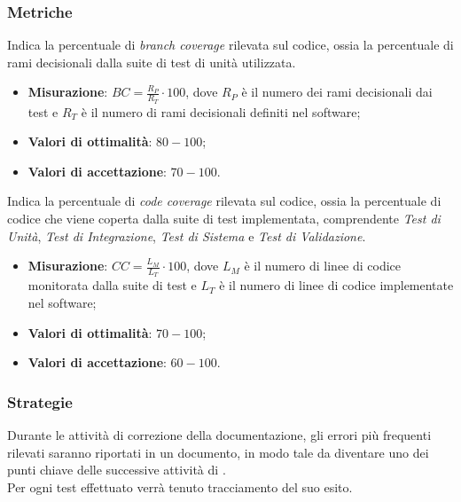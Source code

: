 \subsubsection{Metriche}
\label{coperturaTest}
Indica la percentuale di \textit{branch coverage} rilevata sul codice, ossia la percentuale di rami decisionali  dalla suite di test di unità utilizzata.
\begin{itemize}
\item \textbf{Misurazione}: $BC=\frac{R_{P}}{R_{T}} \cdot 100$, dove $R_{P}$ è il numero dei rami decisionali  dai test e $R_{T}$ è il numero di rami decisionali definiti nel software;
\item \textbf{Valori di ottimalità}: $80 - 100$;
\item \textbf{Valori di accettazione}: $70 - 100$.
\end{itemize}
\label{codeCoverage}
Indica la percentuale di \textit{code coverage} rilevata sul codice, ossia la percentuale di codice che viene coperta dalla suite di test implementata, comprendente \textit{Test di Unità}, \textit{Test di Integrazione}, \textit{Test di Sistema} e \textit{Test di Validazione}.
\begin{itemize}
\item \textbf{Misurazione}: $CC=\frac{L_{M}}{L_{T}} \cdot 100$, dove $L_{M}$ è il numero di linee di codice monitorata dalla suite di test e $L_{T}$ è il numero di linee di codice implementate nel software;
\item \textbf{Valori di ottimalità}: $70 - 100$;
\item \textbf{Valori di accettazione}: $60 - 100$.
\end{itemize}
\subsubsection{Strategie}
Durante le attività di correzione della documentazione, gli errori più frequenti rilevati saranno riportati in un documento, in modo tale da diventare uno dei punti chiave delle successive attività di \textit{}.\\
Per ogni test effettuato verrà tenuto tracciamento del suo esito.
